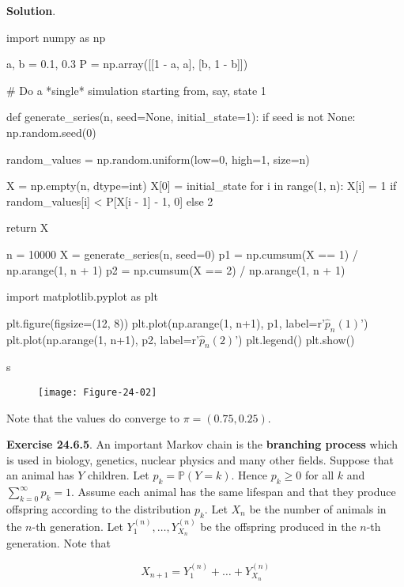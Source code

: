 \textbf{Solution}.

\begin{python}
import numpy as np

a, b = 0.1, 0.3
P = np.array([[1 - a, a], [b, 1 - b]])
\end{python}

\begin{python}
# Do a *single* simulation starting from, say, state 1

def generate_series(n, seed=None, initial_state=1):
    if seed is not None:
        np.random.seed(0)

    random_values = np.random.uniform(low=0, high=1, size=n)

    X = np.empty(n, dtype=int)
    X[0] = initial_state
    for i in range(1, n):
        X[i] = 1 if random_values[i] < P[X[i - 1] - 1, 0] else 2
        
    return X

n = 10000
X = generate_series(n, seed=0)
p1 = np.cumsum(X == 1) / np.arange(1, n + 1)
p2 = np.cumsum(X == 2) / np.arange(1, n + 1)
\end{python}

\begin{python}
import matplotlib.pyplot as plt

plt.figure(figsize=(12, 8))
plt.plot(np.arange(1, n+1), p1, label=r'$\hat{p}_n(1)$')
plt.plot(np.arange(1, n+1), p2, label=r'$\hat{p}_n(2)$')
plt.legend()
plt.show()
\end{python}s

\begin{figure}[H]
\texttt{[image: Figure-24-02]}
\end{figure}

Note that the values do converge to \(\pi = (0.75, 0.25)\).

\textbf{Exercise 24.6.5}. An important Markov chain is the
\textbf{branching process} which is used in biology, genetics, nuclear
physics and many other fields. Suppose that an animal has \(Y\)
children. Let \(p_k = \mathbb{P}(Y = k)\). Hence \(p_k \geq 0\) for all
\(k\) and \(\sum_{k = 0}^\infty p_k = 1\). Assume each animal has the
same lifespan and that they produce offspring according to the
distribution \(p_k\). Let \(X_n\) be the number of animals in the
\(n\)-th generation. Let \(Y_1^{(n)}, \dots, Y_{X_n}^{(n)}\) be the
offspring produced in the \(n\)-th generation. Note that

\[ X_{n+1} = Y_1^{(n)} + \dots + Y_{X_n}^{(n)}\]

